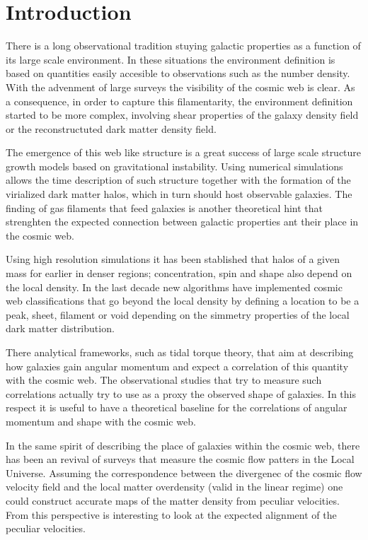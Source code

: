 \documentclass[useAMS,usenatbib]{mn2e}
\begin{document}
\section{Introduction}
\label{sec:introduction}

There is a long observational tradition stuying galactic properties
as a function of its large scale environment. In these situations the environment
definition is based on quantities easily accesible to observations
such as the number density. With the advenment of large
surveys the visibility of the cosmic web is clear. As a consequence,
in order to capture this filamentarity, the environment definition
started to be more complex, involving shear properties of the galaxy
density field or the reconstructuted dark matter density field.

The emergence of this web like structure is a great success of large
scale structure growth models based on gravitational
instability. Using numerical simulations allows the time description
of such structure together with the formation of the virialized dark
matter halos, which in turn should host observable galaxies. The
finding of gas filaments that feed galaxies is another theoretical
hint that strenghten the expected connection between galactic
properties ant their place in the cosmic web.

Using high resolution simulations it has been stablished that halos of
a given mass for earlier in denser regions; concentration, spin and
shape also depend on the local density. In the last decade new
algorithms have implemented cosmic web classifications that go beyond
the local density by defining a location to be a peak, sheet, filament
or void depending on the simmetry properties of the local dark matter
distribution. 

There analytical frameworks, such as tidal torque theory, that
aim at describing how galaxies gain angular momentum and expect a
correlation of this quantity with the cosmic web. The observational
studies that try to measure such correlations actually try to use as a
proxy the observed shape of galaxies. In this respect it is useful to
have a theoretical baseline for the correlations of angular momentum
and shape with the cosmic web. 

In the same spirit of describing the place of galaxies within the
cosmic web, there has been an revival of surveys that measure the
cosmic flow patters in the Local Universe. Assuming the correspondence
between the divergenec of the cosmic flow velocity field and the local
matter overdensity (valid in the linear regime) one could construct
accurate maps of the matter density from peculiar velocities. From
this perspective is interesting to look at the expected alignment of
the peculiar velocities.
\end{document}
